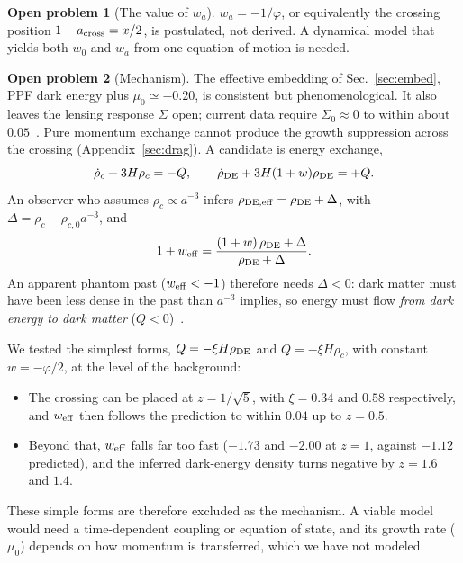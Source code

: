 \documentclass[11pt]{article}
\theoremstyle{definition}
\newtheorem{problem}{Open problem}
\theoremstyle{remark}
\newcommand{\gr}{\varphi}
\begin{document}
\begin{problem}[The value of $w_a$]\label{op:wa}
$w_a = -1/\gr$, or equivalently the crossing position $1 - a_{\rm cross} = x/2$, is postulated, not derived. A dynamical model that yields both $w_0$ and $w_a$ from one equation of motion is needed.
\end{problem}

\begin{problem}[Mechanism]\label{op:mech}
The effective embedding of Sec.~\ref{sec:embed}, PPF dark energy plus $\mu_0 \simeq -0.20$, is consistent but phenomenological. It also leaves the lensing response $\Sigma$ open; current data require $\Sigma_0 \approx 0$ to within about $0.05$~\cite{Ishak}. Pure momentum exchange cannot produce the growth suppression across the crossing (Appendix~\ref{sec:drag}). A candidate is energy exchange,
\begin{equation}
\dot\rho_c + 3H\rho_c = -Q, \qquad \dot\rho_{\rm DE} + 3H(1+w)\rho_{\rm DE} = +Q.
\end{equation}
An observer who assumes $\rho_c \propto a^{-3}$ infers $\rho_{\rm DE,eff} = \rho_{\rm DE} + \Delta$, with $\Delta = \rho_c - \rho_{c,0}a^{-3}$, and
\begin{equation}
1 + w_{\rm eff} = \frac{(1+w)\,\rho_{\rm DE} + \Delta}{\rho_{\rm DE} + \Delta}.
\end{equation}
An apparent phantom past ($w_{\rm eff} < -1$) therefore needs $\Delta < 0$: dark matter must have been less dense in the past than $a^{-3}$ implies, so energy must flow \emph{from dark energy to dark matter} ($Q < 0$)~\cite{DasCorasanitiKhoury}.

We tested the simplest forms, $Q = -\xi H\rho_{\rm DE}$ and $Q = -\xi H\rho_c$, with constant $w = -\gr/2$, at the level of the background:
\begin{itemize}
\item The crossing can be placed at $z = 1/\sqrt5$, with $\xi = 0.34$ and $0.58$ respectively, and $w_{\rm eff}$ then follows the prediction to within $0.04$ up to $z = 0.5$.
\item Beyond that, $w_{\rm eff}$ falls far too fast ($-1.73$ and $-2.00$ at $z = 1$, against $-1.12$ predicted), and the inferred dark-energy density turns negative by $z = 1.6$ and $1.4$.
\end{itemize}
These simple forms are therefore excluded as the mechanism. A viable model would need a time-dependent coupling or equation of state, and its growth rate ($\mu_0$) depends on how momentum is transferred, which we have not modeled.
\end{problem}
\end{document}

